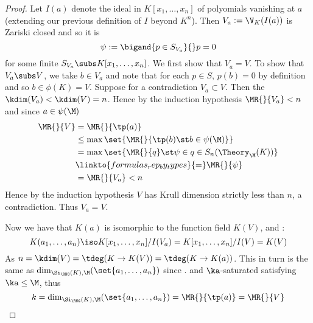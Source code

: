 \begin{proof}
    Let $I(a)$ denote the ideal in $K[x_1,\dots,x_n]$ 
    of polyomials vanishing at $a$ 
    (extending our previous definition of $I$ beyond $K^n$).
    Then $V_a := \V_K(I(a))$ is Zariski closed and so it is 
    \[\psi := \bigand{p \in S_{V_a}}{} p = 0\]
    for some finite $S_{V_a} \subs K[x_1,\dots,x_n]$.
    We first show that $V_a = V$.
    To show that $V_a \subs V$, we take $b \in V_a$ and note that 
    for each $p \in S$, $p(b) = 0$ by definition and so  
    $b \in \phi(K) = V$.
    Suppose for a contradiction $V_a \subset V$.
    Then the $\kdim(V_a) < \kdim(V) = n$.
    Hence by the induction hypothesis $\MR{}{V_a} < n$ 
    and since $a \in \psi(\M)$
    \begin{align*}
        \MR{}{V} 
        &= \MR{}{\tp(a)} \\
        &\leq \max\set{\MR{}{\tp(b) \st b \in \psi(\M)}}\\
        &= \max \set{\MR{}{q} \st \psi \in q \in S_n(\Theory_\M(K))}\\
        &\linkto{formulas_rep_by_types}{=} \MR{}{\psi} \\
        &= \MR{}{V_a} < n
    \end{align*}
    Hence by the induction hypothesis $V$ 
    has Krull dimension strictly less than $n$, a contradiction.
    Thus $V_a = V$.

    Now we have that $K(a)$ is isomorphic to the function field $K(V)$,
    and :
    \[
        K(a_1,\dots,a_n) \iso 
        K[x_1,\dots,x_n] / I(V_a) = 
        K[x_1,\dots,x_n] / I(V) = K(V)
    \]
    As  
    $n = \kdim(V) = \tdeg(K \to K(V)) = \tdeg(K \to K(a))$. 
    This in turn is the same as 
    $\dim_{\Si_\RNG(K),\M}(\set{a_1,\dots,a_n})$
    since .
    and $\ka$-saturated satisfying $\ka \leq \M$,
    thus 
    \[
        k = \dim_{\Si_\RNG(K),\M}(\set{a_1,\dots,a_n}) 
        = \MR{}{\tp(a)} = \MR{}{V}
    \]
\end{proof}